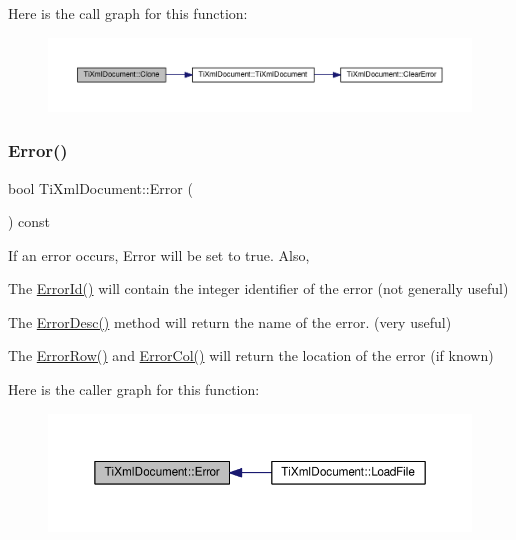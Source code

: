 Here is the call graph for this function\+:
\nopagebreak
\begin{figure}[H]
\begin{center}
\leavevmode
\includegraphics[width=350pt]{class_ti_xml_document_a46a4dda6c56eb106d46d4046ae1e5353_cgraph}
\end{center}
\end{figure}
\mbox{\label{class_ti_xml_document_a348e68faad4a3498f413c51ee9bc321a}} 
\subsubsection{\texorpdfstring{Error()}{Error()}}
{\footnotesize\ttfamily bool Ti\+Xml\+Document\+::\+Error (\begin{DoxyParamCaption}{ }\end{DoxyParamCaption}) const\hspace{0.3cm}{\ttfamily [inline]}}

If an error occurs, Error will be set to true. Also,
\begin{DoxyItemize}
\item The \hyperlink{class_ti_xml_document_abd928b49a646c8ed53e0453c555d96a2}{Error\+Id()} will contain the integer identifier of the error (not generally useful)
\item The \hyperlink{class_ti_xml_document_aab511be262e84a003e3bb86f0215c8c2}{Error\+Desc()} method will return the name of the error. (very useful)
\item The \hyperlink{class_ti_xml_document_a062e5257128a7da31b0b2e38cd524600}{Error\+Row()} and \hyperlink{class_ti_xml_document_adea69de889449a2587afb8ee043f43f5}{Error\+Col()} will return the location of the error (if known) 
\end{DoxyItemize}Here is the caller graph for this function\+:
\nopagebreak
\begin{figure}[H]
\begin{center}
\leavevmode
\includegraphics[width=350pt]{class_ti_xml_document_a348e68faad4a3498f413c51ee9bc321a_icgraph}
\end{center}
\end{figure}
\mbox{\label{class_ti_xml_document_adea69de889449a2587afb8ee043f43f5}} 
